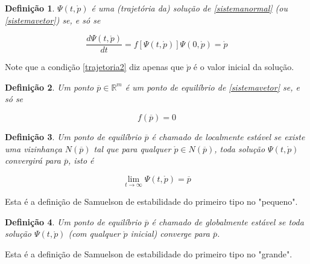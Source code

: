 \documentclass[
	12pt,				%
	openright,			%
	twoside,			%
	a4paper,			%
	english,			%
	french,				%
	spanish,			%
	brazil				%
	]{abntex2}
\newtheorem{definicao}{Definição}[chapter]
\newcommand{\R}{\mathbb{R}}
\newcommand{\solucao}{\Psi(t, \mathring{p})}
\newcommand{\pbola}{\mathring{p}}
\newcommand{\pbarra}{\overline{p}}
\begin{document}
\begin{definicao}
$\solucao$ é uma (trajetória da) solução de \ref{sistemanormal}
(ou \ref{sistemavetor}) se, e só se

\begin{subequations}

	\begin{equation} \label{trajetoria1}
		\frac{d\solucao}{dt} = f[\solucao]
	\end{equation}

	\begin{equation} \label{trajetoria2}
		\Psi(0, \pbola) = \pbola
	\end{equation}

\end{subequations}

\end{definicao}

Note que a condição \ref{trajetoria2} diz apenas que $\pbola$ é o valor
inicial da solução.

\begin{definicao}
	Um ponto $\pbarra \in \R^m$ é um ponto de equilíbrio de \ref{sistemavetor}
	se, e só se

	\begin{equation} \label{ptoequilibrio}
		f(\pbarra) = 0
	\end{equation}

\end{definicao}

\begin{definicao}
	Um ponto de equilíbrio $\pbarra$ é chamado de localmente estável se existe
	uma vizinhança $N(\pbarra)$ tal que para qualquer $\pbola \in N(\pbarra)$,
	toda solução $\solucao$ convergirá para $\pbarra$, isto é

	\begin{equation} \label{estabpequeno}
		\lim_{t \to \infty} \solucao = \pbarra
	\end{equation}

\end{definicao}

Esta é a definição de Samuelson de estabilidade do primeiro tipo no "pequeno".

\begin{definicao}
	Um ponto de equilíbrio $\pbarra$ é chamado de globalmente estável se
	toda solução $\solucao$ (com qualquer $\pbola$ inicial) converge para
	$\pbarra$.
\end{definicao}

Esta é a definição de Samuelson de estabilidade do primeiro tipo no "grande".
\end{document}
